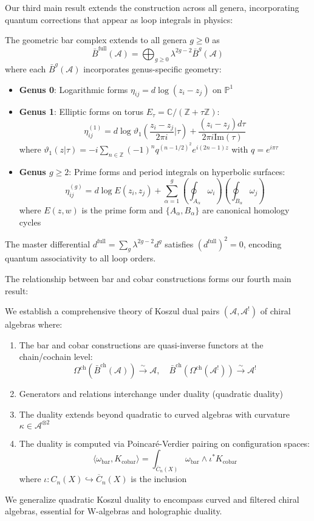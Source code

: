 Our third main result extends the construction across all genera, incorporating quantum corrections that appear as loop integrals in physics:

\begin{theorem}
The geometric bar complex extends to all genera $g \geq 0$ as
$$\bar{B}^{\text{full}}(\mathcal{A}) = \bigoplus_{g \geq 0} \lambda^{2g-2} \bar{B}^g(\mathcal{A})$$
where each $\bar{B}^g(\mathcal{A})$ incorporates genus-specific geometry:
\begin{itemize}
\item \textbf{Genus 0}: Logarithmic forms $\eta_{ij} = d\log(z_i - z_j)$ on $\mathbb{P}^1$
\item \textbf{Genus 1}: Elliptic forms on torus $E_\tau = \mathbb{C}/(\mathbb{Z} + \tau\mathbb{Z})$:
  $$\eta_{ij}^{(1)} = d\log\vartheta_1\left(\frac{z_i - z_j}{2\pi i}|\tau\right) + \frac{(z_i - z_j)d\tau}{2\pi i \text{Im}(\tau)}$$
  where $\vartheta_1(z|\tau) = -i\sum_{n \in \mathbb{Z}}(-1)^n q^{(n-1/2)^2}e^{i(2n-1)z}$ with $q = e^{i\pi\tau}$
\item \textbf{Genus $g \geq 2$}: Prime forms and period integrals on hyperbolic surfaces:
  $$\eta_{ij}^{(g)} = d\log E(z_i, z_j) + \sum_{\alpha=1}^g \left(\oint_{A_\alpha} \omega_i\right) \left(\oint_{B_\alpha} \omega_j\right)$$
  where $E(z,w)$ is the prime form and $\{A_\alpha, B_\alpha\}$ are canonical homology cycles
\end{itemize}
The master differential $d^{\text{full}} = \sum_{g} \lambda^{2g-2} d^g$ satisfies $(d^{\text{full}})^2 = 0$, encoding quantum associativity to all loop orders.
\end{theorem}

The relationship between bar and cobar constructions forms our fourth main result:

\begin{theorem}
We establish a comprehensive theory of Koszul dual pairs $(\mathcal{A}, \mathcal{A}^!)$ of chiral algebras where:
\begin{enumerate}
\item The bar and cobar constructions are quasi-inverse functors at the chain/cochain level:
   $$\Omega^{\text{ch}}(\bar{B}^{\text{ch}}(\mathcal{A})) \xrightarrow{\sim} \mathcal{A}, \quad \bar{B}^{\text{ch}}(\Omega^{\text{ch}}(\mathcal{A}^!)) \xrightarrow{\sim} \mathcal{A}^!$$
\item Generators and relations interchange under duality (quadratic duality)
\item The duality extends beyond quadratic to curved algebras with curvature $\kappa \in \mathcal{A}^{\otimes 2}$
\item The duality is computed via Poincaré-Verdier pairing on configuration spaces:
   $$\langle \omega_{\text{bar}}, K_{\text{cobar}} \rangle = \int_{\overline{C}_n(X)} \omega_{\text{bar}} \wedge \iota^* K_{\text{cobar}}$$
   where $\iota: C_n(X) \hookrightarrow \overline{C}_n(X)$ is the inclusion
\end{enumerate}
We generalize quadratic Koszul duality to encompass curved and filtered chiral algebras, essential for W-algebras and holographic duality.
\end{theorem}

